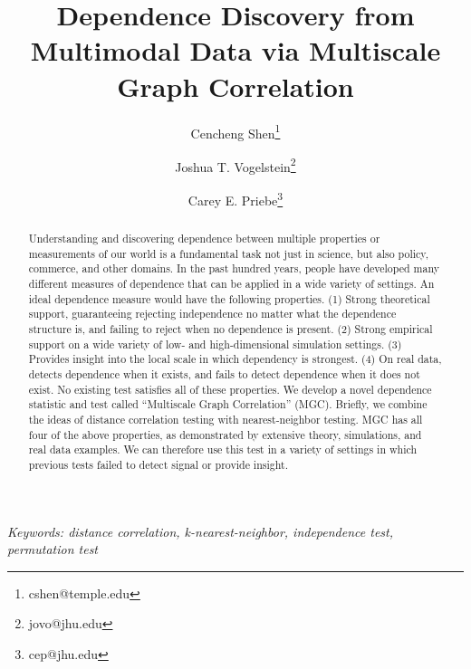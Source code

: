 \documentclass[11pt]{article}
\begin{document}
\def\spacingset#1{\renewcommand{\baselinestretch}%
{#1}\small\normalsize} \spacingset{1}

\title{\bf Dependence Discovery from Multimodal Data via  Multiscale Graph Correlation}
\author[1]{Cencheng Shen\thanks{cshen@temple.edu}}
\author[2]{Joshua T. Vogelstein\thanks{jovo@jhu.edu}}
\author[3]{Carey E. Priebe\thanks{cep@jhu.edu}}
\maketitle
\pagestyle{empty}

\bigskip
\begin{abstract}
Understanding and discovering dependence between multiple properties or measurements of our world is a fundamental task not just in science, but also policy, commerce, and other domains. In the past hundred years, people have developed many different measures of dependence that can be applied in a wide variety of settings.  An ideal dependence measure would have the following properties. (1) Strong theoretical support, guaranteeing rejecting independence no matter what the dependence structure is, and failing to reject when no dependence is present. (2) Strong empirical support on a wide variety of low- and high-dimensional simulation settings. (3) Provides insight into the local scale in which dependency is strongest. (4) On real data, detects dependence when it exists, and fails to detect dependence when it does not exist. No existing test satisfies all of these properties. We develop a novel dependence statistic and test called ``Multiscale Graph Correlation'' (MGC).  Briefly, we combine the ideas of distance correlation testing with nearest-neighbor testing.  MGC has all four of the above properties, as demonstrated by extensive theory, simulations, and real data examples. We can therefore use this test in a variety of settings in which previous tests failed to detect signal or provide insight.
\end{abstract}

\noindent%
{\it Keywords: distance correlation, k-nearest-neighbor, independence test, permutation test}  
\vfill

\clearpage
\tableofcontents

\end{document}
